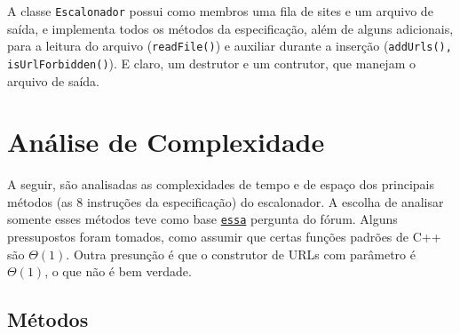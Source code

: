 \documentclass{article}
\def\code#1{\texttt{#1}}
\begin{document}
A classe \code{Escalonador} possui como membros uma fila de sites e um arquivo de saída, e implementa todos os métodos da especificação, além de alguns adicionais, para a leitura do arquivo (\code{readFile()}) e auxiliar durante a inserção (\code{addUrls(), isUrlForbidden()}). E claro, um destrutor e um contrutor, que manejam o arquivo de saída.

\section{Análise de Complexidade}

A seguir, são analisadas as complexidades de tempo e de espaço dos principais métodos (as 8 instruções da especificação) do escalonador. A escolha de analisar somente esses métodos teve como base \href{https://virtual.ufmg.br/20212/mod/forum/discuss.php?d=31528}{\nolinkurl{essa}} pergunta do fórum. Alguns pressupostos foram tomados, como assumir que certas funções padrões de C++ são \(\Theta(1)\). Outra presunção é que o construtor de URLs com parâmetro é \( \Theta(1) \), o que não é bem verdade.

\subsection{Métodos}
\end{document}

